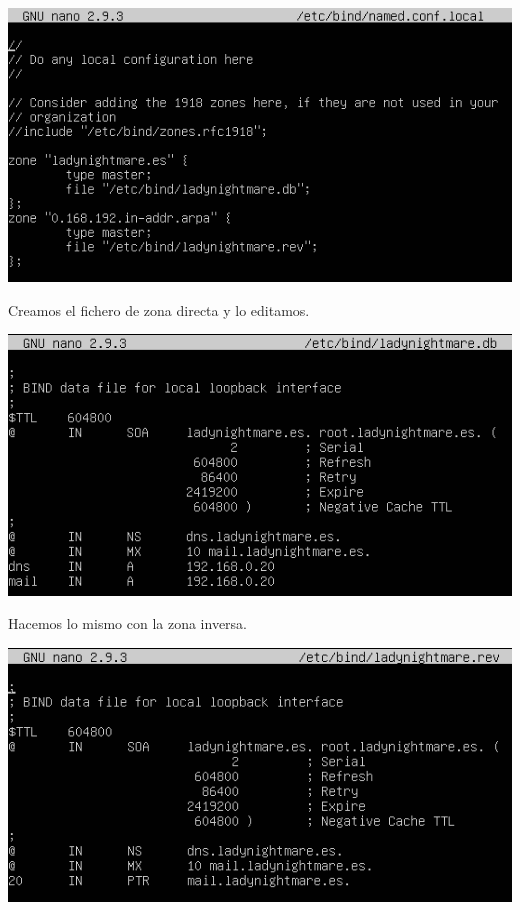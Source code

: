 \documentclass{article}
\begin{document}
\begin{center}
\includegraphics[scale=0.6]{images/zone.png}
\end{center}

Creamos el fichero de zona directa y lo editamos.

\begin{center}
\includegraphics[scale=0.5]{images/directa.png}
\end{center}

Hacemos lo mismo con la zona inversa.

\begin{center}
\includegraphics[scale=0.6]{images/inversa.png}
\end{center}
\end{document}
